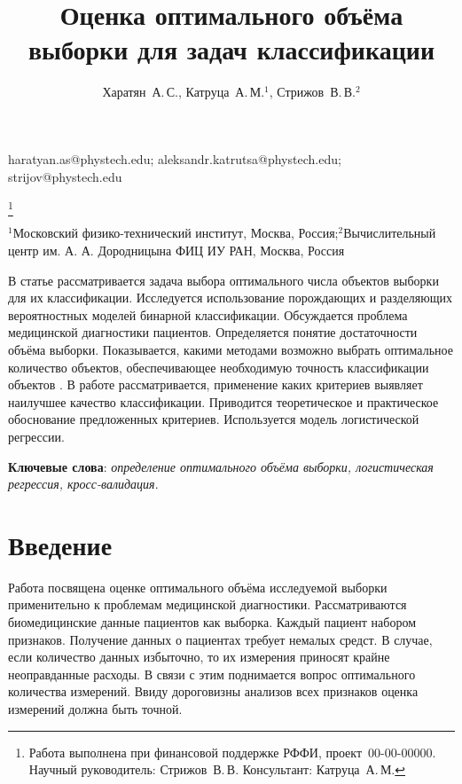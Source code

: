 \documentclass[12pt,twoside]{article}
\begin{document}
\title
    {Оценка оптимального объёма выборки для задач классификации}
\author
    {Харатян~А.\,С., Катруца~А.\,М.$^1$, Стрижов~В.\,В.$^2$} %
\email
	{haratyan.as@phystech.edu; aleksandr.katrutsa@phystech.edu; strijov@phystech.edu}

\thanks
    {Работа выполнена при финансовой поддержке РФФИ, проект \No\,00-00-00000.
     Научный руководитель:  Стрижов~В.\,В.
     Консультант:  Катруца~А.\,М.}

\organization
    {$^1$Московский физико-технический институт, Москва, Россия;$^2$Вычислительный центр им. А. А. Дородницына ФИЦ ИУ РАН, Москва, Россия}
    
\abstract
	{В статье рассматривается задача выбора оптимального числа объектов выборки для их классификации. Исследуется использование порождающих и разделяющих вероятностных моделей бинарной классификации. Обсуждается проблема медицинской диагностики пациентов. Определяется понятие достаточности объёма выборки. Показывается, какими методами возможно выбрать оптимальное количество объектов, обеспечивающее необходимую точность классификации объектов . В работе рассматривается, применение каких критериев выявляет наилучшее качество классификации. Приводится теоретическое и практическое обоснование предложенных критериев. Используется модель логистической регрессии.

\bigskip
\noindent
\textbf{Ключевые слова}: \emph {определение оптимального объёма выборки, логистическая регрессия, кросс-валидация}.

}


\maketitle


\section{Введение}

Работа посвящена оценке оптимального объёма исследуемой выборки применительно к проблемам медицинской диагностики. Рассматриваются биомедицинские данные пациентов как выборка. Каждый пациент набором признаков. 
Получение данных о пациентах требует немалых средст. В случае, если количество данных избыточно, то их измерения приносят крайне неоправданные расходы. В связи с этим поднимается вопрос оптимального количества измерений.
Ввиду дороговизны анализов всех признаков оценка измерений должна быть точной. 
\end{document}
